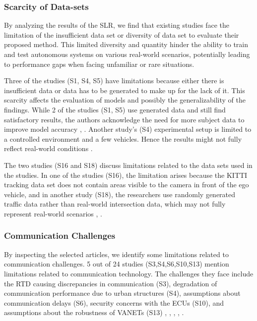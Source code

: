 \documentclass[a4paper,12pt]{article}
\begin{document}
\subsubsection{Scarcity of Data-sets}
\hspace{5mm} By analyzing the results of the SLR, we find that existing studies face the limitation of the insufficient data set or diversity of data set to evaluate their proposed method. This limited diversity and quantity hinder the ability to train and test autonomous systems on various real-world scenarios, potentially leading to performance gaps when facing unfamiliar or rare situations.\par
Three of the studies (S1, S4, S5) have limitations because either there is insufficient data or data has to be generated to make up for the lack of it. This scarcity affects the evaluation of models and possibly the generalizability of the findings. While 2 of the studies (S1, S5) use generated data and still find satisfactory results, the authors acknowledge the need for more subject data to improve model accuracy \cite{s1}, \cite{s5}. Another study's (S4) experimental setup is limited to a controlled environment and a few vehicles. Hence the results might not fully reflect real-world conditions \cite{s4}.\par
The two studies (S16 and S18) discuss limitations related to the data sets used in the studies. In one of the studies (S16), the limitation arises because the KITTI tracking data set does not contain areas visible to the camera in front of the ego vehicle, and in another study (S18), the researchers use randomly generated traffic data rather than real-world intersection data, which may not fully represent real-world scenarios \cite{s16}, \cite{s18}.


\subsubsection{Communication Challenges}
\hspace{5mm} By inspecting the selected articles, we identify some limitations related to communication challenges. 5 out of 24 studies (S3,S4,S6,S10,S13) mention limitations related to communication technology. The challenges they face include the RTD causing discrepancies in communication (S3), degradation of communication performance due to urban structures (S4), assumptions about communication delays (S6), security concerns with the ECUs (S10), and assumptions about the robustness of VANETs (S13) \cite{s3}, \cite{s4}, \cite{s6}, \cite{s10}, \cite{s13}.
\end{document}
